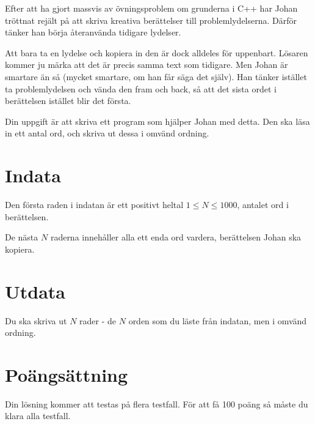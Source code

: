 
Efter att ha gjort massvis av övningsproblem om grunderna i C++ har Johan tröttnat rejält på att skriva kreativa berättelser till problemlydelserna. Därför tänker han börja återanvända tidigare lydelser.

Att bara ta en lydelse och kopiera in den är dock alldeles för uppenbart. Lösaren kommer ju märka att det är precis samma text som tidigare. Men Johan är smartare än så (mycket smartare, om han får säga det själv). Han tänker istället ta problemlydelsen och vända den fram och back, så att det sista ordet i berättelsen istället blir det första.

Din uppgift är att skriva ett program som hjälper Johan med detta. Den ska läsa in ett antal ord, och skriva ut dessa i omvänd ordning.

\section*{Indata}
Den första raden i indatan är ett positivt heltal $1 \le N \le 1000$, antalet ord i berättelsen.

De nästa $N$ raderna innehåller alla ett enda ord vardera, berättelsen Johan ska kopiera.

\section*{Utdata}
Du ska skriva ut $N$ rader - de $N$ orden som du läste från indatan, men i omvänd ordning.

\section*{Poängsättning}
Din lösning kommer att testas på flera testfall. För att få 100 poäng så måste du klara alla testfall.
